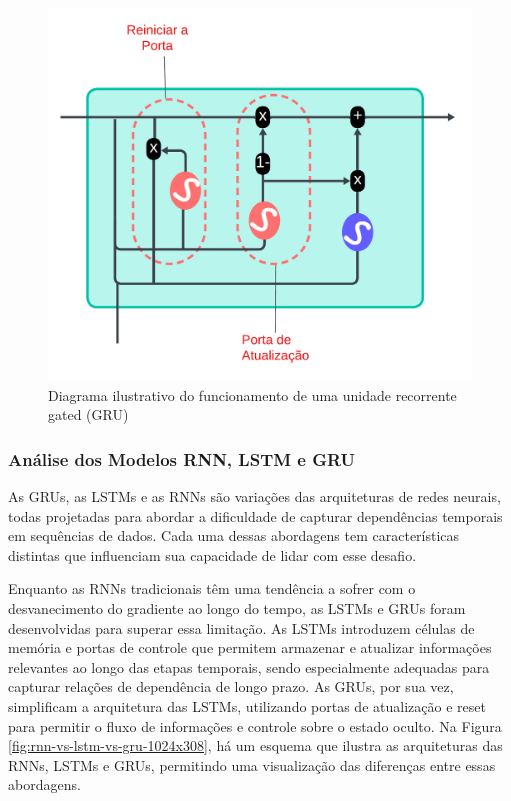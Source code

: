  \begin{figure}[!htb]
 	\centering
 	\caption{Diagrama ilustrativo do funcionamento de uma unidade recorrente gated (GRU)}
 	\label{fig:gru}
 	\includegraphics[width=0.5\linewidth]{Modelos/Figuras/gru}
 	
 \end{figure}
 
 
 
 \subsubsection{An\'alise dos Modelos RNN, LSTM e GRU}
 
 As GRUs, as LSTMs e as RNNs são variações das arquiteturas de redes neurais, todas projetadas para abordar a dificuldade de capturar dependências temporais em sequências de dados. Cada uma dessas abordagens tem características distintas que influenciam sua capacidade de lidar com esse desafio.
 
 Enquanto as RNNs tradicionais têm uma tendência a sofrer com o desvanecimento do gradiente ao longo do tempo, as LSTMs e GRUs foram desenvolvidas para superar essa limitação. As LSTMs introduzem células de memória e portas de controle que permitem armazenar e atualizar informações relevantes ao longo das etapas temporais, sendo especialmente adequadas para capturar relações de dependência de longo prazo. As GRUs, por sua vez, simplificam a arquitetura das LSTMs, utilizando portas de atualização e reset para permitir o fluxo de informações e controle sobre o estado oculto.
 Na Figura \ref{fig:rnn-vs-lstm-vs-gru-1024x308}, há um esquema que ilustra as arquiteturas das RNNs, LSTMs e GRUs, permitindo uma visualização das diferenças entre essas abordagens.
 
